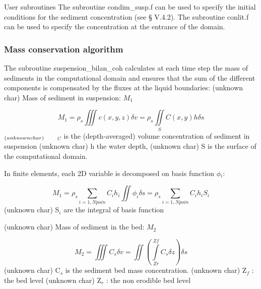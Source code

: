 User subroutines\newline
The subroutine condim\_susp.f can be used to specify the initial conditions
for the sediment concentration (see {\S } V.4.2). \newline
The subroutine conlit.f can be used to specify the concentration at the
entrance of the domain.\newline

\subsubsection{Mass conservation algorithm}

The subroutine suspension\_bilan\_coh calculates at each time step the mass
of sediments in the computational domain and ensures that the sum of the
different components is compensated by the fluxes at the liquid boundaries:%
\newline
(unknown char)\hspace{5mm} Mass of sediment in suspension: $M_{1} $

\begin{equation*}
M_{1} =\rho _{s} \iiint\limits_{} c(x,y,z)\delta v =\rho _{s}
\iint\limits_{S} C(x,y)h \delta s 
\end{equation*}%
$_{(unknown char)\hspace{5mm} }$ $_{C}$ is the (depth-averaged) volume
concentration of sediment in suspension \newline
(unknown char)\hspace{5mm} h the water depth, \newline
(unknown char)\hspace{5mm} S is the surface of the computational domain.

In finite elements, each 2D variable is decomposed on basis function $\phi$$%
_{i}$:

\begin{equation*}
M_{1} =\rho _{s} \sum\limits_{i=1,Npoin}C_{i} h_{i} \iint \phi _{i} \delta
s=\rho _{s} \sum\limits_{i=1,Npoin}C_{i} h_{i} S_{i} 
\end{equation*}%
(unknown char)\hspace{5mm} S$_{i}$ are the integral of basis function

(unknown char)\hspace{5mm} Mass of sediment in the bed: $M_{2} $

\begin{equation*}
M_{2} =\iiint\limits_{} C_{s} \delta v=\iint \left(
\int\limits_{Zr}^{Zf}C_{s} \delta z \right) \delta s 
\end{equation*}%
(unknown char)\hspace{5mm} C$_{s}$ is the sediment bed mass concentration. 
\newline
(unknown char)\hspace{5mm} Z$_{f}$ : the bed level\newline
(unknown char)\hspace{5mm} Z$_{r}$ : the non erodible bed level

